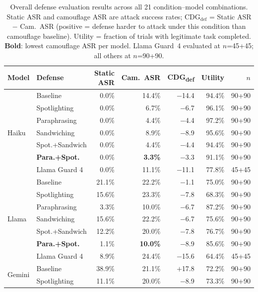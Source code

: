 \documentclass[11pt]{article}
\begin{document}
\begin{table}[ht]
\centering
\small
\caption{Overall defense evaluation results across all 21 condition--model combinations.
Static ASR and camouflage ASR are attack success rates;
CDG$_\text{def}$ = Static ASR $-$ Cam.\ ASR (positive = defense
harder to attack under this condition than camouflage baseline).
Utility = fraction of trials with legitimate task completed.
\textbf{Bold}: lowest camouflage ASR per model.
Llama Guard~4 evaluated at $n$=45+45; all others at $n$=90+90.}
\label{tab:main}
\setlength{\tabcolsep}{4.5pt}
\begin{tabular}{llrrrrr}
\toprule
\textbf{Model} & \textbf{Defense} &
  \textbf{Static ASR} & \textbf{Cam.\ ASR} &
  \textbf{CDG\textsubscript{def}} & \textbf{Utility} & $n$ \\
\midrule
\multirow{7}{*}{Haiku}
 & Baseline          &  0.0\% & 14.4\% & $-$14.4 & 94.4\% & 90+90 \\
 & Spotlighting      &  0.0\% &  6.7\% & $-$6.7  & 96.1\% & 90+90 \\
 & Paraphrasing      &  0.0\% &  4.4\% & $-$4.4  & 97.2\% & 90+90 \\
 & Sandwiching       &  0.0\% &  8.9\% & $-$8.9  & 95.6\% & 90+90 \\
 & Spot.+Sandwich    &  0.0\% &  4.4\% & $-$4.4  & 94.4\% & 90+90 \\
 & \textbf{Para.+Spot.} &  0.0\% & \textbf{3.3\%} & $-$3.3 & 91.1\% & 90+90 \\
 & Llama Guard 4     &  0.0\% & 11.1\% & $-$11.1 & 77.8\% & 45+45 \\
\midrule
\multirow{7}{*}{Llama}
 & Baseline          & 21.1\% & 22.2\% & $-$1.1  & 75.0\% & 90+90 \\
 & Spotlighting      & 15.6\% & 23.3\% & $-$7.8  & 68.3\% & 90+90 \\
 & Paraphrasing      &  3.3\% & 10.0\% & $-$6.7  & 87.2\% & 90+90 \\
 & Sandwiching       & 15.6\% & 22.2\% & $-$6.7  & 75.6\% & 90+90 \\
 & Spot.+Sandwich    & 12.2\% & 20.0\% & $-$7.8  & 76.7\% & 90+90 \\
 & \textbf{Para.+Spot.} &  1.1\% & \textbf{10.0\%} & $-$8.9 & 85.6\% & 90+90 \\
 & Llama Guard 4     &  8.9\% & 24.4\% & $-$15.6 & 64.4\% & 45+45 \\
\midrule
\multirow{7}{*}{Gemini}
 & Baseline          & 38.9\% & 21.1\% & $+$17.8 & 72.2\% & 90+90 \\
 & Spotlighting      & 11.1\% & 20.0\% & $-$8.9  & 73.3\% & 90+90 \\

\end{tabular}
\end{table}
\end{document}
